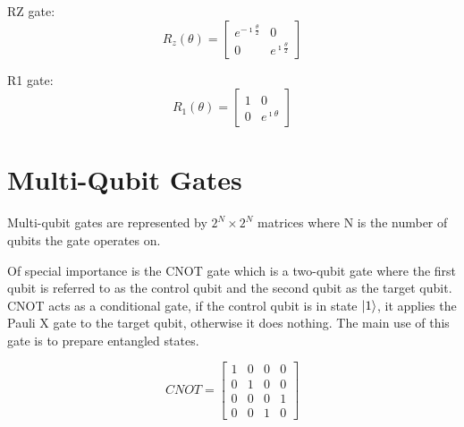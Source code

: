 RZ gate:
$$R_z(\theta)=\left[\begin{array}{cc}e^{-\imath \frac{\theta}{2}} & 0 \\ 0 & e^{\imath \frac{\theta}{2}}\end{array}\right]$$

R1 gate:
$$R_1(\theta)=\left[\begin{array}{cc}1 & 0 \\ 0 & e^{\imath \theta}\end{array}\right]$$

\section{Multi-Qubit Gates}

Multi-qubit gates are represented by $2^N \times 2^N$ matrices where N is the number of qubits the gate operates on.

Of special importance is the CNOT gate which is a two-qubit gate where the first qubit is referred to as the control qubit and the second qubit as the target qubit. CNOT acts as a conditional gate, if the control qubit is in state $\left|{1}\right\rangle$, it applies the Pauli X gate to the target qubit, otherwise it does nothing. The main use of this gate is to prepare entangled states.

$$CNOT=\left[\begin{array}{cccc}1 & 0 & 0 & 0 \\ 0 & 1 & 0 & 0 \\ 0 & 0 & 0 & 1 \\ 0 & 0 & 1 & 0\end{array}\right]$$
